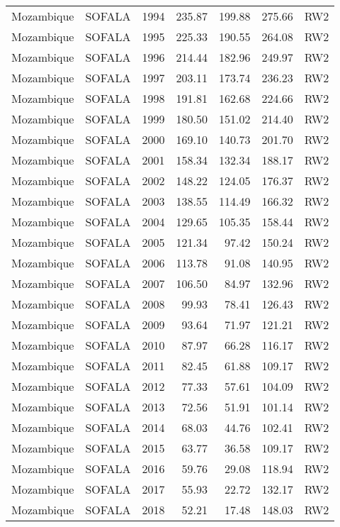 \begin{longtable}{lllrrrl}
  Mozambique & SOFALA & 1994 & 235.87 & 199.88 & 275.66 & RW2 \\ 
  Mozambique & SOFALA & 1995 & 225.33 & 190.55 & 264.08 & RW2 \\ 
  Mozambique & SOFALA & 1996 & 214.44 & 182.96 & 249.97 & RW2 \\ 
  Mozambique & SOFALA & 1997 & 203.11 & 173.74 & 236.23 & RW2 \\ 
  Mozambique & SOFALA & 1998 & 191.81 & 162.68 & 224.66 & RW2 \\ 
  Mozambique & SOFALA & 1999 & 180.50 & 151.02 & 214.40 & RW2 \\ 
  Mozambique & SOFALA & 2000 & 169.10 & 140.73 & 201.70 & RW2 \\ 
  Mozambique & SOFALA & 2001 & 158.34 & 132.34 & 188.17 & RW2 \\ 
  Mozambique & SOFALA & 2002 & 148.22 & 124.05 & 176.37 & RW2 \\ 
  Mozambique & SOFALA & 2003 & 138.55 & 114.49 & 166.32 & RW2 \\ 
  Mozambique & SOFALA & 2004 & 129.65 & 105.35 & 158.44 & RW2 \\ 
  Mozambique & SOFALA & 2005 & 121.34 & 97.42 & 150.24 & RW2 \\ 
  Mozambique & SOFALA & 2006 & 113.78 & 91.08 & 140.95 & RW2 \\ 
  Mozambique & SOFALA & 2007 & 106.50 & 84.97 & 132.96 & RW2 \\ 
  Mozambique & SOFALA & 2008 & 99.93 & 78.41 & 126.43 & RW2 \\ 
  Mozambique & SOFALA & 2009 & 93.64 & 71.97 & 121.21 & RW2 \\ 
  Mozambique & SOFALA & 2010 & 87.97 & 66.28 & 116.17 & RW2 \\ 
  Mozambique & SOFALA & 2011 & 82.45 & 61.88 & 109.17 & RW2 \\ 
  Mozambique & SOFALA & 2012 & 77.33 & 57.61 & 104.09 & RW2 \\ 
  Mozambique & SOFALA & 2013 & 72.56 & 51.91 & 101.14 & RW2 \\ 
  Mozambique & SOFALA & 2014 & 68.03 & 44.76 & 102.41 & RW2 \\ 
  Mozambique & SOFALA & 2015 & 63.77 & 36.58 & 109.17 & RW2 \\ 
  Mozambique & SOFALA & 2016 & 59.76 & 29.08 & 118.94 & RW2 \\ 
  Mozambique & SOFALA & 2017 & 55.93 & 22.72 & 132.17 & RW2 \\ 
  Mozambique & SOFALA & 2018 & 52.21 & 17.48 & 148.03 & RW2 \\ 

\end{longtable}
